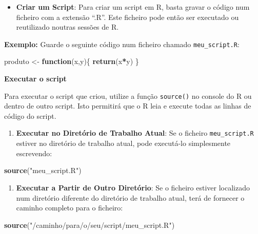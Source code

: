 \documentclass[
]{book}
\newenvironment{Shaded}{\begin{snugshade}}{\end{snugshade}}
\newcommand{\ControlFlowTok}[1]{\textcolor[rgb]{0.13,0.29,0.53}{\textbf{#1}}}
\newcommand{\FunctionTok}[1]{\textcolor[rgb]{0.13,0.29,0.53}{\textbf{#1}}}
\newcommand{\NormalTok}[1]{#1}
\newcommand{\OtherTok}[1]{\textcolor[rgb]{0.56,0.35,0.01}{#1}}
\newcommand{\SpecialCharTok}[1]{\textcolor[rgb]{0.81,0.36,0.00}{\textbf{#1}}}
\newcommand{\StringTok}[1]{\textcolor[rgb]{0.31,0.60,0.02}{#1}}
\providecommand{\tightlist}{%
  \setlength{\itemsep}{0pt}\setlength{\parskip}{0pt}}
\begin{document}
\begin{itemize}
\tightlist
\item
  \textbf{Criar um Script}: Para criar um script em R, basta gravar o
  código num ficheiro com a extensão ``.R''. Este ficheiro pode então
  ser executado ou reutilizado noutras sessões de R.
\end{itemize}

\textbf{Exemplo:} Guarde o seguinte código num ficheiro chamado
\texttt{meu\_script.R}:

\begin{Shaded}
\begin{Highlighting}[]
\NormalTok{produto }\OtherTok{\textless{}{-}} \ControlFlowTok{function}\NormalTok{(x,y)\{}
  \FunctionTok{return}\NormalTok{(x}\SpecialCharTok{*}\NormalTok{y)}
\NormalTok{\}}
\end{Highlighting}
\end{Shaded}

\textbf{Executar o script}

Para executar o script que criou, utilize a função \texttt{source()} no console
do R ou dentro de outro script. Isto permitirá que o R leia e execute
todas as linhas de código do script.

\begin{enumerate}
\def\labelenumi{\arabic{enumi}.}
\tightlist
\item
  \textbf{Executar no Diretório de Trabalho Atual}: Se o ficheiro
  \texttt{meu\_script.R} estiver no diretório de trabalho atual, pode
  executá-lo simplesmente escrevendo:
\end{enumerate}

\begin{Shaded}
\begin{Highlighting}[]
\FunctionTok{source}\NormalTok{(}\StringTok{"meu\_script.R"}\NormalTok{)}
\end{Highlighting}
\end{Shaded}

\begin{enumerate}
\def\labelenumi{\arabic{enumi}.}
\setcounter{enumi}{1}
\tightlist
\item
  \textbf{Executar a Partir de Outro Diretório}: Se o ficheiro estiver
  localizado num diretório diferente do diretório de trabalho atual,
  terá de fornecer o caminho completo para o ficheiro:
\end{enumerate}

\begin{Shaded}
\begin{Highlighting}[]
\FunctionTok{source}\NormalTok{(}\StringTok{"/caminho/para/o/seu/script/meu\_script.R"}\NormalTok{)}
\end{Highlighting}
\end{Shaded}
\end{document}

